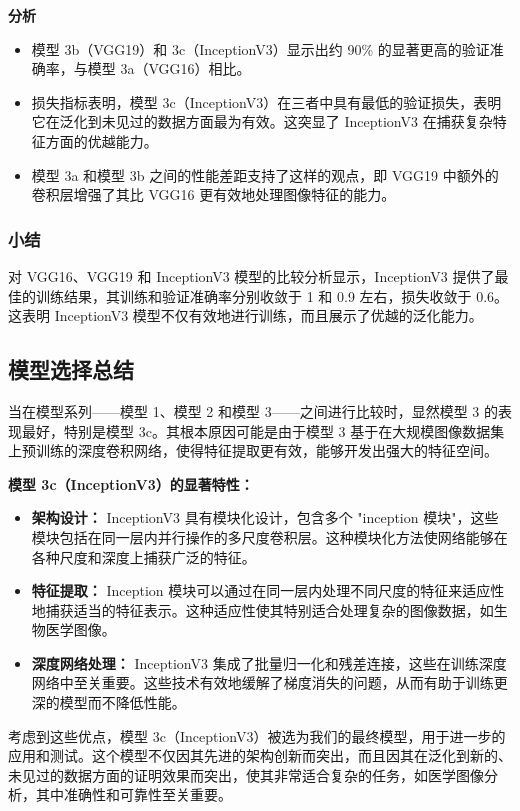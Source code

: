 \textbf{分析}
\begin{itemize}
    \item 模型 3b（VGG19）和 3c（InceptionV3）显示出约 90\% 的显著更高的验证准确率，与模型 3a（VGG16）相比。
    \item 损失指标表明，模型 3c（InceptionV3）在三者中具有最低的验证损失，表明它在泛化到未见过的数据方面最为有效。这突显了 InceptionV3 在捕获复杂特征方面的优越能力。
    \item 模型 3a 和模型 3b 之间的性能差距支持了这样的观点，即 VGG19 中额外的卷积层增强了其比 VGG16 更有效地处理图像特征的能力。
\end{itemize}

\subsubsection{小结}

对 VGG16、VGG19 和 InceptionV3 模型的比较分析显示，InceptionV3 提供了最佳的训练结果，其训练和验证准确率分别收敛于 1 和 0.9 左右，损失收敛于 0.6。这表明 InceptionV3 模型不仅有效地进行训练，而且展示了优越的泛化能力。

\subsection{模型选择总结}
当在模型系列——模型 1、模型 2 和模型 3——之间进行比较时，显然模型 3 的表现最好，特别是模型 3c。其根本原因可能是由于模型 3 基于在大规模图像数据集上预训练的深度卷积网络，使得特征提取更有效，能够开发出强大的特征空间。

\textbf{模型 3c（InceptionV3）的显著特性：}

\begin{itemize}
    \item \textbf{架构设计：} InceptionV3 具有模块化设计，包含多个 "inception 模块"，这些模块包括在同一层内并行操作的多尺度卷积层。这种模块化方法使网络能够在各种尺度和深度上捕获广泛的特征。
    \item \textbf{特征提取：} Inception 模块可以通过在同一层内处理不同尺度的特征来适应性地捕获适当的特征表示。这种适应性使其特别适合处理复杂的图像数据，如生物医学图像。
    \item \textbf{深度网络处理：} InceptionV3 集成了批量归一化和残差连接，这些在训练深度网络中至关重要。这些技术有效地缓解了梯度消失的问题，从而有助于训练更深的模型而不降低性能。
\end{itemize}

考虑到这些优点，模型 3c（InceptionV3）被选为我们的最终模型，用于进一步的应用和测试。这个模型不仅因其先进的架构创新而突出，而且因其在泛化到新的、未见过的数据方面的证明效果而突出，使其非常适合复杂的任务，如医学图像分析，其中准确性和可靠性至关重要。
